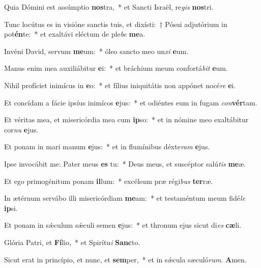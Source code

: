 \item Quia Dómini est assúmptio \textbf{nos}tra,~* et Sancti Israël, re\textit{gis} \textbf{nos}tri.
\item Tunc locútus es in visióne sanctis tuis, et dixísti:~† Pósui adjutórium in pot\textbf{én}te:~* et exaltávi eléctum de ple\textit{be} \textbf{me}a.
\item Invéni David, servum \textbf{me}um:~* óleo sancto meo un\textit{xi} \textbf{e}um.
\item Manus enim mea auxiliábitur \textbf{e}i:~* et bráchium meum confortá\textit{bit} \textbf{e}um.
\item Nihil profíciet inimícus in \textbf{e}o:~* et fílius iniquitátis non appónet nocé\textit{re} \textbf{e}i.
\item Et concídam a fácie ipsíus inimícos \textbf{e}jus:~* et odiéntes eum in fugam \textit{con}\textbf{vér}tam.
\item Et véritas mea, et misericórdia mea cum \textbf{ip}so:~* et in nómine meo exaltábitur cor\textit{nu} \textbf{e}jus.
\item Et ponam in mari manum \textbf{e}jus:~* et in flumínibus déxte\textit{ram} \textbf{e}jus.
\item Ipse invocábit me: Pater meus \textbf{es} tu:~* Deus meus, et suscéptor salú\textit{tis} \textbf{me}æ.
\item Et ego primogénitum ponam \textbf{il}lum:~* excélsum præ régi\textit{bus} \textbf{ter}ræ.
\item In ætérnum servábo illi misericórdiam \textbf{me}am:~* et testaméntum meum fidé\textit{le} \textbf{ip}si.
\item Et ponam in sǽculum sǽculi semen \textbf{e}jus:~* et thronum ejus sicut di\textit{es} \textbf{cæ}li.
\item Glória Patri, et \textbf{Fí}lio,~* et Spirítu\textit{i} \textbf{Sanc}to.
\item Sicut erat in princípio, et nunc, et \textbf{sem}per,~* et in sǽcula sæculó\textit{rum}. \textbf{A}men.
